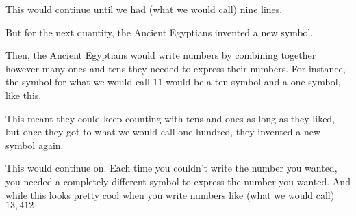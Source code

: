 \documentclass{ximera}
\begin{document}
\begin{image}
\end{image}


This would continue until we had (what we would call) nine lines.

\begin{image}
\end{image}


But for the next quantity, the Ancient Egyptians invented a new symbol.

\begin{image}
\end{image}


Then, the Ancient Egyptians would write numbers by combining together however many ones and tens they needed to express their numbers. For instance, the symbol for what we would call $11$ would be a ten symbol and a one symbol, like this.

\begin{image}
\end{image}

 This meant they could keep counting with tens and ones as long as they liked, but once they got to what we would call one hundred, they invented a new symbol again.

\begin{image}
\end{image}

This would continue on. Each time you couldn't write the number you wanted, you needed a completely different symbol to express the number you wanted. And while this looks pretty cool when you write numbers like (what we would call) $13,412$

\begin{image}
\end{image}
\end{document}
